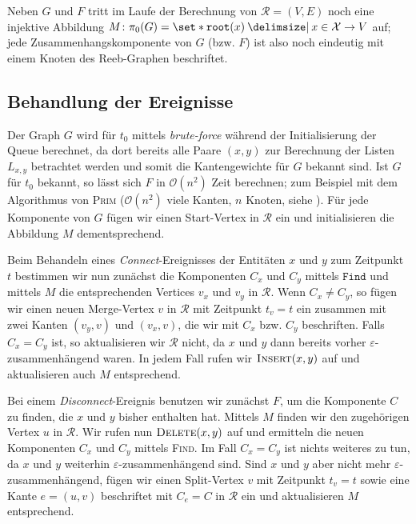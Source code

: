 Neben $G$ und $F$ tritt im Laufe der Berechnung von $\mathcal{R}=(V,E)$ noch eine injektive Abbildung $M \colon \pi_0(G) = \set*{\mathtt{root}(x) \given x \in \mathcal{X}} \to V$ auf; jede Zusammenhangskomponente von $G$ (bzw. $F$) ist also noch eindeutig mit einem Knoten des Reeb-Graphen beschriftet.

\subsection{Behandlung der Ereignisse} %
\label{sub:behandlung_der_ereignisse}
Der Graph $G$ wird für $t_0$ mittels \emph{brute-force} während der Initialisierung der Queue berechnet, da dort bereits alle Paare $(x,y)$ zur Berechnung der Listen $L_{x,y}$ betrachtet werden und somit die Kantengewichte für $G$ bekannt sind.
Ist $G$ für $t_0$ bekannt, so lässt sich $F$ in $\mathcal{O}(n^2)$ Zeit berechnen; zum Beispiel mit dem Algorithmus von \textsc{Prim} ($\mathcal{O}(n^2)$ viele Kanten, $n$ Knoten, siehe \textcite[p.~573]{cormenIntroduction}).
Für jede Komponente von $G$ fügen wir einen Start-Vertex in $\mathcal{R}$ ein und initialisieren die Abbildung $M$ dementsprechend.

Beim Behandeln eines \emph{Connect}-Ereignisses der Entitäten $x$ und $y$ zum Zeitpunkt $t$ bestimmen wir nun zunächst die Komponenten $C_x$ und $C_y$ mittels $\mathtt{Find}$ und mittels $M$ die entsprechenden Vertices $v_x$ und $v_y$ in $\mathcal{R}$.
Wenn $C_x \neq C_y$, so fügen wir einen neuen Merge-Vertex $v$ in $\mathcal{R}$ mit Zeitpunkt $t_v = t$ ein zusammen mit zwei Kanten $(v_y,v)$ und $(v_x,v)$, die wir mit $C_x$ bzw. $C_y$ beschriften.
Falls $C_x = C_y$ ist, so aktualisieren wir $\mathcal{R}$ nicht, da $x$ und $y$ dann bereits vorher $\varepsilon$-zusammenhängend waren.
In jedem Fall rufen wir $\textsc{Insert}(x,y)$ auf und aktualisieren auch $M$ entsprechend.

Bei einem \emph{Disconnect}-Ereignis benutzen wir zunächst $F$, um die Komponente $C$ zu finden, die $x$ und $y$ bisher enthalten hat.
Mittels $M$ finden wir den zugehörigen Vertex $u$ in $\mathcal{R}$.
Wir rufen nun $\textsc{Delete}(x,y)$ auf und ermitteln die neuen Komponenten $C_x$ und $C_y$ mittels \textsc{Find}.
Im Fall $C_x=C_y$ ist nichts weiteres zu tun, da $x$ und $y$ weiterhin $\varepsilon$-zusammenhängend sind.
Sind $x$ und $y$ aber nicht mehr $\varepsilon$-zusammenhängend, fügen wir einen Split-Vertex $v$ mit Zeitpunkt $t_v=t$ sowie eine Kante $e=(u,v)$ beschriftet mit $C_e=C$ in $\mathcal{R}$ ein und aktualisieren $M$ entsprechend.

